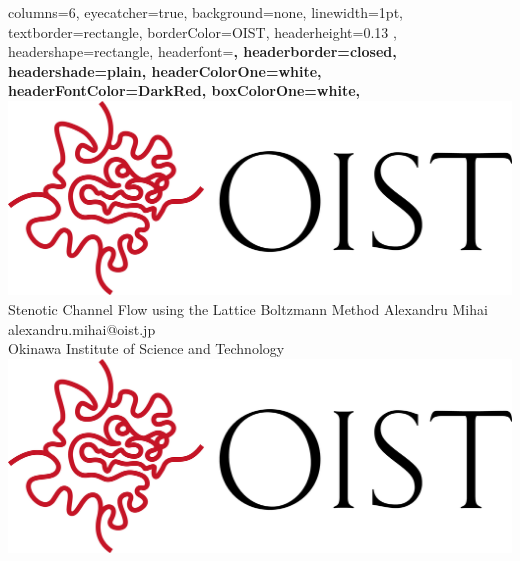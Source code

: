\documentclass[
    a0paper, %
    landscape, %
    fontscale=0.34 %
    ]{baposter}
\begin{document}
\begin{poster}{ %
    columns=6, %
    eyecatcher=true, %
    background=none, %
    linewidth=1pt, %
    textborder=rectangle, %
    borderColor=OIST, %
    headerheight=0.13 \textheight, %
    headershape=rectangle, %
    headerfont=\large \sf \bf, %
    headerborder=closed, %
    headershade=plain, %
    headerColorOne=white, %
    headerFontColor=DarkRed, %
    boxColorOne=white, %
} 
{ \includegraphics[height=.75 \headerheight]{logo.jpg} } %
{ \color{OIST}\huge Stenotic Channel Flow using the Lattice Boltzmann Method } %
{ \color{OIST}\small
  \vspace{1em} 
  Alexandru Mihai\\
  alexandru.mihai@oist.jp\\
  Okinawa Institute of Science and Technology
} %
{ \includegraphics[height=.75 \headerheight]{logo.jpg} } %



\end{poster}
\end{document}
